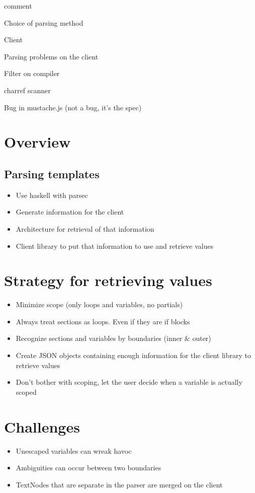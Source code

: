 comment

Choice of parsing method

Client

Parsing problems on the client

Filter on compiler

charref scanner

Bug in mustache.js (not a bug, it's the spec)
\section{Overview}
\subsection{Parsing templates}

\begin{itemize}
\item Use haskell with parsec
\item Generate information for the client
\item Architecture for retrieval of that information
\item Client library to put that information to use and retrieve values
\end{itemize}

\section{Strategy for retrieving values}
\begin{itemize}
\item Minimize scope (only loops and variables, no partials)
\item Always treat sections as loops. Even if they are if blocks
\item Recognize sections and variables by boundaries (inner \& outer)
\item Create JSON objects containing enough information for the client library to retrieve values
\item Don't bother with scoping, let the user decide when a variable is actually scoped
\end{itemize}

\section{Challenges}
\begin{itemize}
\item Unescaped variables can wreak havoc
\item Ambiguities can occur between two boundaries
\item TextNodes that are separate in the parser are merged on the client
\end{itemize}
